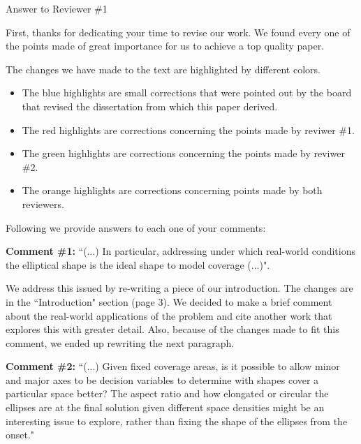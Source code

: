 
	
		
		\begin{letter}{}

		\opening{Answer to Reviewer \#1}
		
		First, thanks for dedicating your time to revise our work. We found every one of the points made of great importance for us to achieve a top quality paper.
		
		The changes we have made to the text are highlighted by different colors. 
		\begin{itemize}
			\item The {\color{blue} blue} highlights are small corrections that were pointed out by the board that revised the dissertation from which this paper derived.
			
			\item The {\color{Red} red} highlights are corrections concerning the points made by reviwer \#1.
			
			\item The {\color{Green} green} highlights are corrections concerning the points made by reviwer \#2.
			
			\item The {\color{Orange} orange} highlights are corrections concerning points made by both reviewers.
		\end{itemize}
		 
		Following we provide answers to each one of your comments:
		
		\textbf{Comment \#1:} ``(...) In particular, addressing under which real-world conditions the elliptical shape is the ideal shape to model coverage (...)".
		
		We address this issued by re-writing a piece of our introduction. The changes are in the ``Introduction" section (page 3). We decided to make a brief comment about the real-world applications of the problem and cite another work that explores this with greater detail. Also, because of the changes made to fit this comment, we ended up rewriting the next paragraph.
		
		\textbf{Comment \#2:} ``(...) Given fixed coverage areas, is it possible to allow minor and major axes to be decision variables to determine with shapes cover a particular space better? The aspect ratio and how elongated or circular the ellipses are at the final solution given different space densities might be an interesting issue to explore, rather than fixing the shape of the ellipses from the onset."
		

\end{letter}

